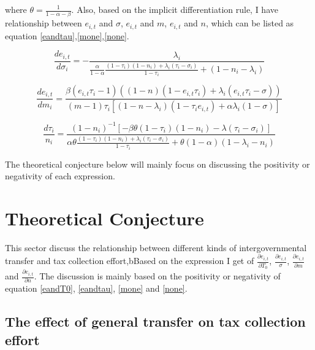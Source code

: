 where $\theta=\frac{1}{1-\alpha-\beta}$. Also, based on the implicit differentiation rule, I have relationship between $e_{i,t}$ and $\sigma$, $e_{i,t}$ and $m$, $e_{i,t}$ and $n$, which can be listed as equation \ref{eandtau},\ref{mone},\ref{none}.

\begin{equation}
    \frac{d e_{i,t}}{d \sigma_i}=-\frac{\lambda_i}{\frac{\alpha}{1-\alpha} \frac{\left(1-\tau_i\right)\left(1-n_i\right)+\lambda_i\left(\tau_i-\sigma_i\right)}{1-\tau_i}+\left(1-n_i-\lambda_i\right)} \label{eandtau}
\end{equation}

\begin{equation}
    \frac{d e_{i,t}}{d m_i}=\frac{\beta  (e_{i,t} \tau_i -1) ((1-n)(1-e_{i,t}\tau_i)+\lambda_i(e_{i,t}\tau_i-\sigma))}{(m-1) \tau_i   [(1-n-\lambda_i)(1-\tau_i e_{i,t})+\alpha \lambda_i(1-\sigma)]} \label{mone}
\end{equation}

\begin{equation}
    \frac{d \tau_i}{n_i}=\frac{\left(1-n_i\right)^{-1}\left[-\beta \theta\left(1-\tau_i\right)\left(1-n_i\right)-\lambda\left(\tau_i-\sigma_i\right)\right]}{\alpha \theta \frac{\left(1-\tau_i\right)\left(1-n_i\right)+\lambda_i\left(\tau_i-\sigma_i\right)}{1-\tau_i}+\theta(1-\alpha)\left(1-\lambda_i-n_i\right)} \label{none}
\end{equation}

The theoretical conjecture below will mainly focus on discussing the positivity or negativity of each expression.

\section{Theoretical Conjecture}

This sector discuss the relationship between different kinds of intergovernmental transfer and tax collection effort,bBased on the expression I get of $\frac{\partial e_{i,t}}{\partial T_0}$, $\frac{\partial e_{i,t}}{\sigma} $, $\frac{\partial e_{i,t}}{\partial m}$ and $\frac{\partial e_{i,t}}{\partial n}$. The discussion is mainly based on the positivity or negativity of equation \ref{eandT0}, \ref{eandtau}, \ref{mone} and \ref{none}.


\subsection{The effect of general transfer on tax collection effort}


